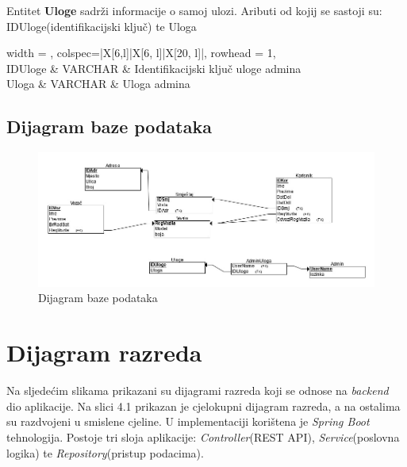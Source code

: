 				{Entitet \textbf{Uloge} sadrži informacije o samoj ulozi. Aributi od kojij se sastoji su: IDUloge(identifikacijski ključ) te Uloga}
				
				\begin{longtblr}[
					label=none,
					entry=none
					]{
						width = \textwidth,
						colspec={|X[6,l]|X[6, l]|X[20, l]|}, 
						rowhead = 1,
					} %
					\hline {}	 \\ \hline[3pt]
					IDUloge & VARCHAR	&  	Identifikacijski ključ uloge admina	\\ \hline
					Uloga	& VARCHAR & Uloga admina	\\ \hline 
					\end{longtblr}

			\subsection{Dijagram baze podataka}
			
			
			\begin{figure}[H]
				\includegraphics[width=\linewidth]{slike/DentAll_RelacijskiDijagramBaze.png}
				\centering
				\caption{Dijagram baze podataka}
				\label{fig:dijagramBaze}
			\end{figure}
			\eject
			
		\section{Dijagram razreda}
		
			{Na sljedećim slikama prikazani su dijagrami razreda koji se odnose na \textit{backend} dio aplikacije. Na slici 4.1 prikazan je cjelokupni dijagram razreda, a na ostalima su razdvojeni u smislene cjeline. U implementaciji korištena je \textit{Spring Boot} tehnologija. Postoje tri sloja aplikacije: \textit{Controller}(REST API), \textit{Service}(poslovna logika) te \textit{Repository}(pristup podacima). }\\
			
